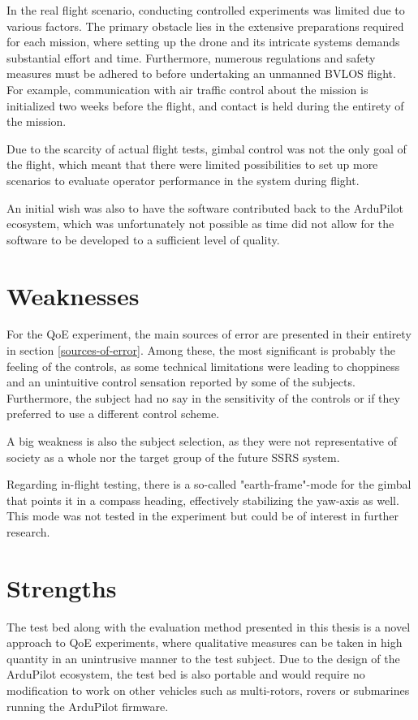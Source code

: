 \documentclass[nofilelist]{cslthse-msc}
\begin{document}
In the real flight scenario, conducting controlled experiments was limited due to various factors. The primary obstacle lies in the extensive preparations required for each mission, where setting up the drone and its intricate systems demands substantial effort and time. Furthermore, numerous regulations and safety measures must be adhered to before undertaking an unmanned BVLOS flight. For example, communication with air traffic control about the mission is initialized two weeks before the flight, and contact is held during the entirety of the mission.

Due to the scarcity of actual flight tests, gimbal control was not the only goal of the flight, which meant that there were limited possibilities to set up more scenarios to evaluate operator performance in the system during flight. 

An initial wish was also to have the software contributed back to the ArduPilot ecosystem, which was unfortunately not possible as time did not allow for the software to be developed to a sufficient level of quality.

\section{Weaknesses}
For the QoE experiment, the main sources of error are presented in their entirety in section \ref{sources-of-error}. Among these, the most significant is probably the feeling of the controls, as some technical limitations were leading to choppiness and an unintuitive control sensation reported by some of the subjects. Furthermore, the subject had no say in the sensitivity of the controls or if they preferred to use a different control scheme.

A big weakness is also the subject selection, as they were not representative of society as a whole nor the target group of the future SSRS system.   

Regarding in-flight testing, there is a so-called "earth-frame"-mode for the gimbal that points it in a compass heading, effectively stabilizing the yaw-axis as well. This mode was not tested in the experiment but could be of interest in further research.

\section{Strengths}
The test bed along with the evaluation method presented in this thesis is a novel approach to QoE experiments, where qualitative measures can be taken in high quantity in an unintrusive manner to the test subject. Due to the design of the ArduPilot ecosystem, the test bed is also portable and would require no modification to work on other vehicles such as multi-rotors, rovers or submarines running the ArduPilot firmware.
\end{document}
